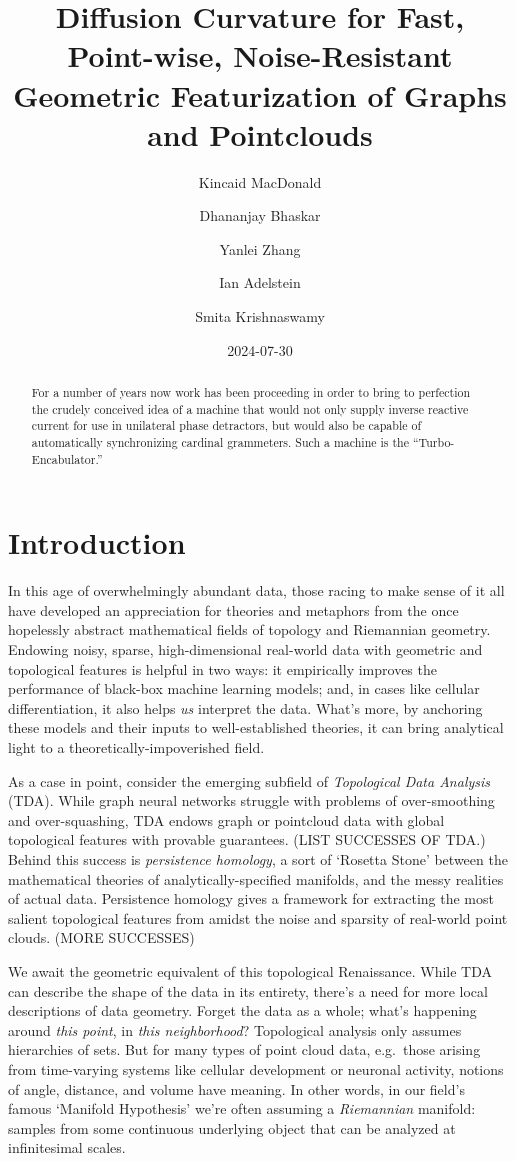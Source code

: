 \documentclass[
  letterpaper,
  DIV=11,
  numbers=noendperiod]{scrartcl}
\title{Diffusion Curvature for Fast, Point-wise, Noise-Resistant
Geometric Featurization of Graphs and Pointclouds}
\author{Kincaid MacDonald \and Dhananjay Bhaskar \and Yanlei
Zhang \and Ian Adelstein \and Smita Krishnaswamy}
\date{2024-07-30}
\theoremstyle{plain}
\theoremstyle{definition}
\theoremstyle{plain}
\theoremstyle{definition}
\theoremstyle{plain}
\theoremstyle{remark}
\begin{document}
\maketitle
\begin{abstract}
For a number of years now work has been proceeding in order to bring to
perfection the crudely conceived idea of a machine that would not only
supply inverse reactive current for use in unilateral phase detractors,
but would also be capable of automatically synchronizing cardinal
grammeters. Such a machine is the ``Turbo-Encabulator.''
\end{abstract}


\newcommand\Kaly[1]{\textcolor{blue}{Kaly: [[[#1]]]}}

\section{Introduction}\label{introduction}

In this age of overwhelmingly abundant data, those racing to make sense
of it all have developed an appreciation for theories and metaphors from
the once hopelessly abstract mathematical fields of topology and
Riemannian geometry. Endowing noisy, sparse, high-dimensional real-world
data with geometric and topological features is helpful in two ways: it
empirically improves the performance of black-box machine learning
models; and, in cases like cellular differentiation, it also helps
\emph{us} interpret the data. What's more, by anchoring these models and
their inputs to well-established theories, it can bring analytical light
to a theoretically-impoverished field.

As a case in point, consider the emerging subfield of \emph{Topological
Data Analysis} (TDA). While graph neural networks struggle with problems
of over-smoothing and over-squashing, TDA endows graph or pointcloud
data with global topological features with provable guarantees. (LIST
SUCCESSES OF TDA.) Behind this success is \emph{persistence homology}, a
sort of `Rosetta Stone' between the mathematical theories of
analytically-specified manifolds, and the messy realities of actual
data. Persistence homology gives a framework for extracting the most
salient topological features from amidst the noise and sparsity of
real-world point clouds. (MORE SUCCESSES)

We await the geometric equivalent of this topological Renaissance. While
TDA can describe the shape of the data in its entirety, there's a need
for more local descriptions of data geometry. Forget the data as a
whole; what's happening around \emph{this point}, in \emph{this
neighborhood}? Topological analysis only assumes hierarchies of sets.
But for many types of point cloud data, e.g.~those arising from
time-varying systems like cellular development or neuronal activity,
notions of angle, distance, and volume have meaning. In other words, in
our field's famous `Manifold Hypothesis' we're often assuming a
\emph{Riemannian} manifold: samples from some continuous underlying
object that can be analyzed at infinitesimal scales.
\end{document}
